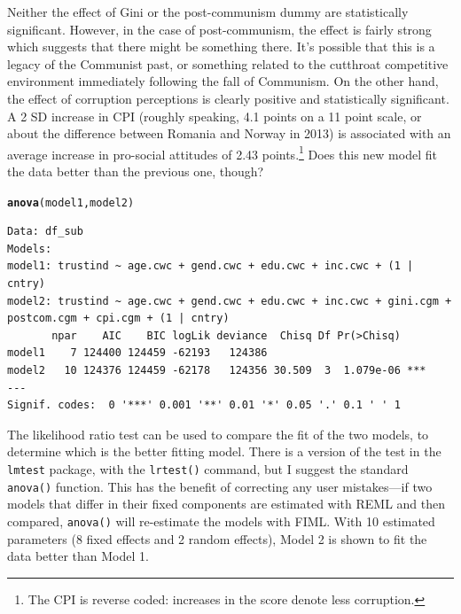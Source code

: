 \documentclass[12pt,english]{article}\usepackage[]{graphicx}\usepackage[usenames, dvipsnames]{xcolor}
\makeatletter
\newcommand{\hlstd}[1]{\textcolor[rgb]{0.345,0.345,0.345}{#1}}%
\newcommand{\hlkwd}[1]{\textcolor[rgb]{0.737,0.353,0.396}{\textbf{#1}}}%
\newenvironment{kframe}{%
 \def\at@end@of@kframe{}%
 \ifinner\ifhmode%
  \def\at@end@of@kframe{\end{minipage}}%
  \begin{minipage}{\columnwidth}%
 \fi\fi%
 \def\FrameCommand##1{\hskip\@totalleftmargin \hskip-\fboxsep
 \colorbox{shadecolor}{##1}\hskip-\fboxsep
     \hskip-\linewidth \hskip-\@totalleftmargin \hskip\columnwidth}%
 \MakeFramed {\advance\hsize-\width
   \@totalleftmargin\z@ \linewidth\hsize
   \@setminipage}}%
 {\par\unskip\endMakeFramed%
 \at@end@of@kframe}
\newenvironment{knitrout}{}{} %
\makeatother
\begin{document}
Neither the effect of Gini or the post-communism dummy are statistically significant. However, in the case of post-communism, the effect is fairly strong which suggests that there might be something there. It's possible that this is a legacy of the Communist past, or something related to the cutthroat competitive environment immediately following the fall of Communism. On the other hand, the effect of corruption perceptions is clearly positive and statistically significant. A 2 SD increase in CPI (roughly speaking, 4.1 points on a 11 point scale, or about the difference between Romania and Norway in 2013) is associated with an average increase in pro-social attitudes of 2.43 points.\footnote{The CPI is reverse coded: increases in the score denote less corruption.} Does this new model fit the data better than the previous one, though?

\begin{knitrout}
\color{fgcolor}\begin{kframe}
\begin{alltt}
\hlkwd{anova}\hlstd{(model1, model2)}
\end{alltt}
\begin{verbatim}
Data: df_sub
Models:
model1: trustind ~ age.cwc + gend.cwc + edu.cwc + inc.cwc + (1 | cntry)
model2: trustind ~ age.cwc + gend.cwc + edu.cwc + inc.cwc + gini.cgm + postcom.cgm + cpi.cgm + (1 | cntry)
       npar    AIC    BIC logLik deviance  Chisq Df Pr(>Chisq)    
model1    7 124400 124459 -62193   124386                         
model2   10 124376 124459 -62178   124356 30.509  3  1.079e-06 ***
---
Signif. codes:  0 '***' 0.001 '**' 0.01 '*' 0.05 '.' 0.1 ' ' 1
\end{verbatim}
\end{kframe}
\end{knitrout}

The likelihood ratio test can be used to compare the fit of the two models, to determine which is the better fitting model. There is a version of the test in the \texttt{lmtest} package, with the \texttt{lrtest()} command, but I suggest the standard \texttt{anova()} function. This has the benefit of correcting any user mistakes---if two models that differ in their fixed components are estimated with REML and then compared, \texttt{anova()} will re-estimate the models with FIML. With 10 estimated parameters (8 fixed effects and 2 random effects), Model 2 is shown to fit the data better than Model 1.
\end{document}
